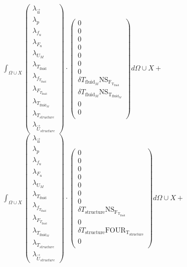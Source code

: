 \documentclass[10pt]{article} %
\begin{document}
\begin{center}
	$\int_{\Omega \cup X}
	\begin{pmatrix}
		\lambda_{\vec{u}} \\ \lambda_p \\ \lambda_{f_u} \\ \lambda_{F_u} \\ \lambda_{U_M}\\ \lambda_{T_{\text{fluid}}} \\ \lambda_{f_{T_{\text{fluid}}}} \\ \lambda_{F_{T_{\text{fluid}}}} \\ \lambda_{T_{\text{fluid}_M}} \\ \lambda_{T_{structure}} \\ \lambda_{\vec{U}_{structure}}
	\end{pmatrix}
	\cdot
	\begin{pmatrix}
		0\\
		0\\
		0 \\
		0\\
		0 \\
		0\\
		0\\
		\delta T_{\text{fluid}_M} \text{NS}_{\text{F}_{\text{T}_{\text{fluid}}}}\\
		\delta T_{\text{fluid}_M} \text{NS}_{\text{T}_{\text{fluid}_M}}\\
		0\\
		0\\
	\end{pmatrix}
	d\Omega \cup X + $\\
	
	$\int_{\Omega \cup X}
	\begin{pmatrix}
		\lambda_{\vec{u}} \\ \lambda_p \\ \lambda_{f_u} \\ \lambda_{F_u} \\ \lambda_{U_M}\\ \lambda_{T_{\text{fluid}}} \\ \lambda_{f_{T_{\text{fluid}}}} \\ \lambda_{F_{T_{\text{fluid}}}} \\ \lambda_{T_{\text{fluid}_M}} \\ \lambda_{T_{structure}} \\ \lambda_{\vec{U}_{structure}}
	\end{pmatrix}
	\cdot
	\begin{pmatrix}
		0\\
		0\\
		0\\
		0\\
		0\\
		0\\
		0\\
		\delta T_{\text{structure}} \text{NS}_{\text{F}_{\text{T}_{\text{fluid}}}} \\
		0\\
		\delta T_{\text{structure}} \text{FOUR}_{\text{T}_{\text{structure}}}\\
		0\\
	\end{pmatrix}
	d\Omega \cup X + $\\


\end{center}
\end{document}
